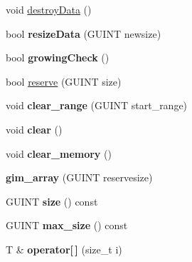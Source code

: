 \textbf{ }\par
\begin{DoxyCompactItemize}
\item 
void \hyperlink{classgim__array_aa7a9dca42674415635846cd077cb4a97}{destroy\+Data} ()
\item 
\mbox{\label{classgim__array_a9d4559f0f847dd3ff602e0b828df31f2}} 
bool {\bfseries resize\+Data} (G\+U\+I\+NT newsize)
\item 
\mbox{\label{classgim__array_aa9c596ff1639a5f6c69c16f25710f7d1}} 
bool {\bfseries growing\+Check} ()
\end{DoxyCompactItemize}

\textbf{ }\par
\begin{DoxyCompactItemize}
\item 
bool \hyperlink{classgim__array_a572f94b5b67d505335150a2dea8a7e3d}{reserve} (G\+U\+I\+NT size)
\item 
\mbox{\label{classgim__array_aaebc1828ad96b461a0351127b1dfb9f3}} 
void {\bfseries clear\+\_\+range} (G\+U\+I\+NT start\+\_\+range)
\item 
\mbox{\label{classgim__array_aae3374d96bac249ba926b6f0825c034e}} 
void {\bfseries clear} ()
\item 
\mbox{\label{classgim__array_afe6bc1b2062f48a25ff1af7bccf46718}} 
void {\bfseries clear\+\_\+memory} ()
\item 
\mbox{\label{classgim__array_a42be09e9a8fa1d7e9f3f8385647d69c2}} 
{\bfseries gim\+\_\+array} (G\+U\+I\+NT reservesize)
\item 
\mbox{\label{classgim__array_a81607b0c307618345418ec2b8b978af0}} 
G\+U\+I\+NT {\bfseries size} () const
\item 
\mbox{\label{classgim__array_a8ab8601b580ef9f951411ac5d25e649b}} 
G\+U\+I\+NT {\bfseries max\+\_\+size} () const
\item 
\mbox{\label{classgim__array_a8c58fd37fa4da11e1dc75a0bb9099363}} 
T \& {\bfseries operator\mbox{[}$\,$\mbox{]}} (size\+\_\+t i)

\end{DoxyCompactItemize}

